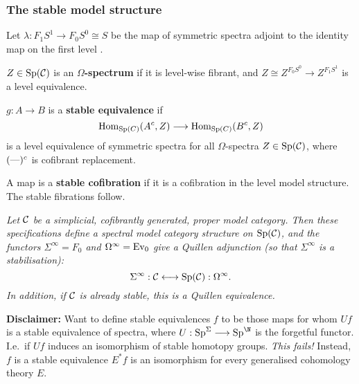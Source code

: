 \documentclass[11pt]{article}
\begin{document}
\begin{MichaelStableModelCats}
\subsubsection*{The stable model structure}
\begin{itemise}
\item Let $\lambda:F_1S^1\to F_0S^0\cong S$ be the map of symmetric spectra adjoint to the identity map on the first level \rednote{[understand]}.
\item $Z\in\operatorname{Sp}(\mathcal{C})$ is an \textbf{$\Omega$-spectrum} if it is level-wise fibrant, and $Z\cong Z^{F_0S^0}\to Z^{F_1S^1}$ is a level equivalence.
\item $g:A\to B$ is a \textbf{stable equivalence} if
\[\operatorname{Hom}_{\operatorname{Sp}(C)}(A^c,Z)\longrightarrow\operatorname{Hom}_{\operatorname{Sp}(C)}(B^c,Z)\]
is a level equivalence of symmetric spectra for all $\Omega$-spectra $Z\in\operatorname{Sp}(\mathcal{C})$, where $(\textup{---})^c$ is cofibrant replacement.
\item A map is a \textbf{stable cofibration} if it is a cofibration in the level model structure. The stable fibrations follow.
\item \textit{Let $\mathcal{C}$ be a simplicial, cofibrantly generated, proper model category.
Then these specifications define a spectral model category structure on $\operatorname{Sp}(\mathcal{C})$, and the functors $\Sigma^{\infty}=F_0$ and $\Omega^\infty=\operatorname{Ev}_0$ give a Quillen adjunction (so that $\Sigma^\infty$ is a stabilisation):
\[\Sigma^\infty:\mathcal{C}\longleftrightarrow\operatorname{Sp}(\mathcal{C}):\Omega^\infty.\]
In addition, if $\mathcal{C}$ is already stable, this is a Quillen equivalence.}
\item \textbf{Disclaimer:} Want to define stable equivalences $f$ to be those maps for whom $Uf$ is a stable equivalence of spectra, where $U:\Sp^\Sigma\to\Sp^\N$ is the forgetful functor. I.e.\ if $Uf$ induces an isomorphism of stable homotopy groups. \emph{This fails!} Instead, $f$ is a stable equivalence \Iff $E^*f$ is an isomorphism for every generalised cohomology theory $E$.
\item {}
\end{itemise}

\end{MichaelStableModelCats}
\end{document}
